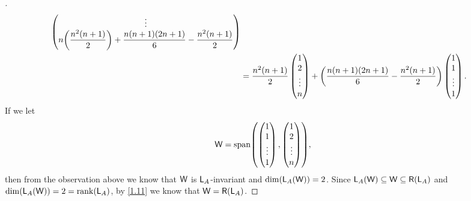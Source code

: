 \begin{proof}[]
\begin{align*}
\begin{pmatrix}
           \vdots                                                                             \\
           n \pa{\dfrac{n^2(n + 1)}{2}} + \dfrac{n(n + 1)(2n + 1)}{6} - \dfrac{n^2(n + 1)}{2}
         \end{pmatrix}                          \\
     & = \dfrac{n^2(n + 1)}{2} \begin{pmatrix}
                                 1      \\
                                 2      \\
                                 \vdots \\
                                 n
                               \end{pmatrix} + \pa{\dfrac{n(n + 1)(2n + 1)}{6} - \dfrac{n^2(n + 1)}{2}} \begin{pmatrix}
                                                                                                          1      \\
                                                                                                          1      \\
                                                                                                          \vdots \\
                                                                                                          1
                                                                                                        \end{pmatrix}.
  \end{align*}
  If we let
  \[
    \W = \spn{\begin{pmatrix}
        1      \\
        1      \\
        \vdots \\
        1
      \end{pmatrix}, \begin{pmatrix}
        1      \\
        2      \\
        \vdots \\
        n
      \end{pmatrix}},
  \]
  then from the observation above we know that \(\mathsf{W}\) is \(\mathsf{L}_A\)-invariant and \(\dim(\mathsf{L}_A(\mathsf{W})) = 2\).
  Since \(\L_A(\W) \subseteq \W \subseteq \rg{\L_A}\) and \(\dim(\L_A(\W)) = 2 = \rk{\L_A}\), by \cref{1.11} we know that \(\W = \rg{\L_A}\).

\end{proof}
